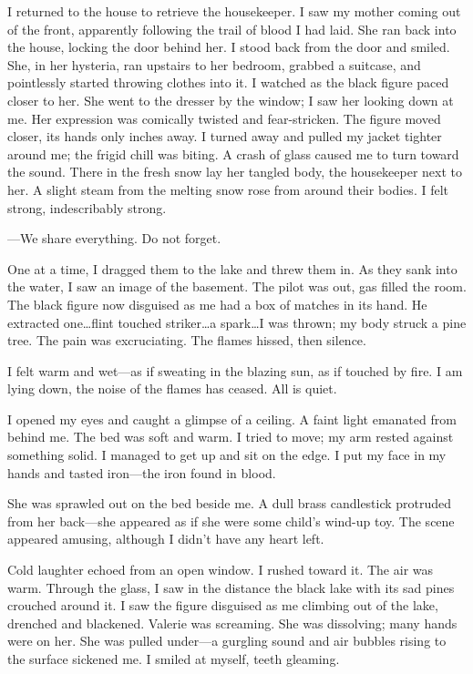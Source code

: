 I returned to the house to retrieve the housekeeper. I saw my mother
coming out of the front, apparently following the trail of blood I had
laid. She ran back into the house, locking the door behind her. I stood
back from the door and smiled. She, in her hysteria, ran upstairs to her
bedroom, grabbed a suitcase, and pointlessly started throwing clothes
into it. I watched as the black figure paced closer to her. She went to
the dresser by the window; I saw her looking down at me. Her expression
was comically twisted and fear-stricken. The figure moved closer, its
hands only inches away. I turned away and pulled my jacket tighter
around me; the frigid chill was biting. A crash of glass caused me to
turn toward the sound. There in the fresh snow lay her tangled body, the
housekeeper next to her. A slight steam from the melting snow rose from
around their bodies. I felt strong, indescribably strong.

---We share everything. Do not forget.

One at a time, I dragged them to the lake and threw them in. As they
sank into the water, I saw an image of the basement. The pilot was out,
gas filled the room. The black figure now disguised as me had a box of
matches in its hand. He extracted one\ldots flint touched
striker\ldots a spark\ldots I was thrown; my body struck a pine tree.
The pain was excruciating. The flames hissed, then silence.

I felt warm and wet---as if sweating in the blazing sun, as if touched
by fire. I am lying down, the noise of the flames has ceased. All is
quiet.

I opened my eyes and caught a glimpse of a ceiling. A faint light
emanated from behind me. The bed was soft and warm. I tried to move; my
arm rested against something solid. I managed to get up and sit on the
edge. I put my face in my hands and tasted iron---the iron found in
blood.

She was sprawled out on the bed beside me. A dull brass candlestick
protruded from her back---she appeared as if she were some child's
wind-up toy. The scene appeared amusing, although I didn't have any
heart left.

Cold laughter echoed from an open window. I rushed toward it. The air
was warm. Through the glass, I saw in the distance the black lake with
its sad pines crouched around it. I saw the figure disguised as me
climbing out of the lake, drenched and blackened. Valerie was screaming.
She was dissolving; many hands were on her. She was pulled under---a
gurgling sound and air bubbles rising to the surface sickened me. I
smiled at myself, teeth gleaming.

